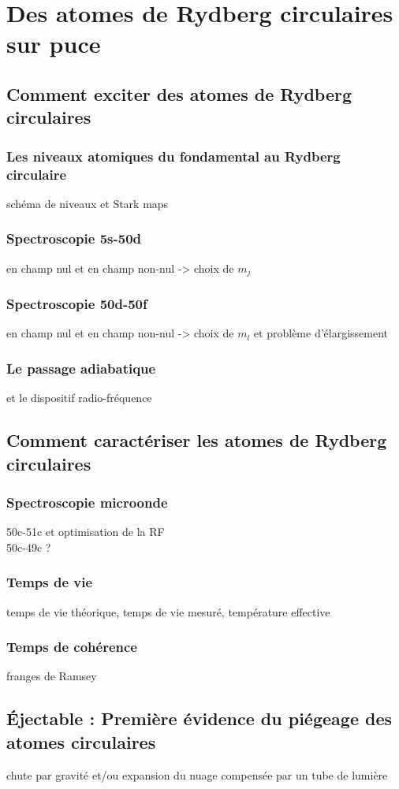 \chapter{Des atomes de Rydberg circulaires sur puce}
\label{chapter:50c}

\section{Comment exciter des atomes de Rydberg circulaires}
	\subsection*{Les niveaux atomiques du fondamental au Rydberg circulaire}
		\noindent schéma de niveaux et Stark maps
	\subsection*{Spectroscopie 5s-50d}
		\noindent en champ nul et en champ non-nul -> choix de $m_j$
	\subsection*{Spectroscopie 50d-50f}
		\noindent en champ nul et en champ non-nul -> choix de $m_l$ et problème d'élargissement
	\subsection*{Le passage adiabatique}
		\noindent et le dispositif radio-fréquence

\section{Comment caractériser les atomes de Rydberg circulaires}
	\subsection*{Spectroscopie microonde}
		\noindent 50c-51c et optimisation de la RF\\
		\noindent 50c-49c ?
	\subsection*{Temps de vie}
		\noindent temps de vie théorique, temps de vie mesuré, température effective
	\subsection*{Temps de cohérence}
		\noindent franges de Ramsey
	


\section{Éjectable : Première évidence du piégeage des atomes circulaires}
	\noindent chute par gravité et/ou expansion du nuage compensée par un tube de lumière
